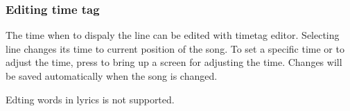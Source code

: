 \subsubsection{Editing time tag}

The time when to dispaly the line can be edited with timetag editor.
Selecting line changes its time to current position of the song.
To set a specific time or to adjust the time, press \ActionStdContext to
 bring up a screen for adjusting the time.
Changes will be saved automatically when the song is changed.

Edting words in lyrics is not supported.

